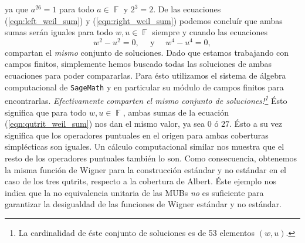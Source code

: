 \documentclass[a4paper,11pt]{report}
\DeclareMathOperator{\F}{\mathbb{F}}
\begin{document}
  ya que $a^{26} = 1$ para todo $a \in \F$ y $2^{3} = 2$.
  De las ecuaciones (\ref{eqn:left_weil_sum}) y
  (\ref{eqn:right_weil_sum}) podemos concluír que ambas
  sumas serán iguales para todo $w, u \in \F$ siempre y
  cuando las ecuaciones
  \begin{equation}
    w^2 - u^2 = 0,
    \quad
    \text{ y }
    \quad
    w^{4} - u^{4} = 0,
  \end{equation}
  compartan el \textit{mismo} conjunto de soluciones. Dado
  que estamos trabajando con campos finitos, simplemente
  hemos buscado todas las soluciones de ambas ecuaciones
  para poder compararlas. Para ésto utilizamos el sistema de
  álgebra computacional de \texttt{SageMath} y en particular
  su módulo de campos finitos para encontrarlas.
  \textit{Efectivamente comparten el mismo conjunto de
  soluciones!\footnote{La cardinalidad de éste conjunto de
  soluciones es de 53 elementos $(w,u)$.}} Ésto significa
  que para todo $w, u \in \F$, ambas sumas de la ecuación
  (\ref{eqn:qutrit_weil_sum}) nos dan el mismo valor, ya sea
  $0$ ó $27$. Ésto a su vez significa que los operadores
  puntuales en el origen para ambas coberturas simplécticas
  son iguales. Un cálculo computacional similar nos muestra
  que el resto de los operadores puntuales también lo son.
  Como consecuencia, obtenemos la misma función de Wigner
  para la construcción estándar y no estándar en el caso de
  los tres qutrits, respecto a la cobertura de Albert. Éste
  ejemplo nos indica que la no equivalencia unitaria de las
  MUBs \textit{no} es suficiente para garantizar la
  desigualdad de las funciones de Wigner estándar y no
  estándar.
\end{document}
